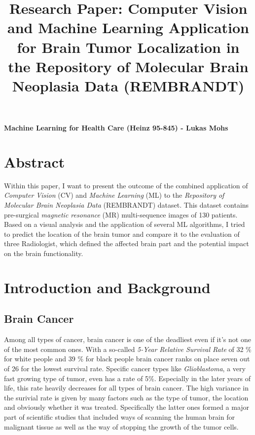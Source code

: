 \documentclass[twoside,11pt]{article}
\begin{document}
\title{Research Paper: Computer Vision and Machine Learning Application for Brain Tumor Localization in the  Repository of Molecular Brain Neoplasia Data (REMBRANDT) }

\maketitle
\textbf{Machine Learning for Health Care (Heinz 95-845) - Lukas Mohs}


\section{Abstract}
\noindent Within this paper, I want to present the outcome of the  combined application of \textit{Computer Vision} (CV) and  \textit{Machine Learning} (ML) to the \textit{Repository of Molecular Brain Neoplasia Data } (REMBRANDT) dataset. This dataset contains pre-surgical \textit{magnetic resonance} (MR) multi-sequence images of 130 patients. Based on a visual analysis and the application of several ML algorithms, I tried to predict the location of the brain tumor and compare it to the evaluation of three Radiologist, which defined the affected brain part and the potential impact on the brain functionality.

\section{Introduction and Background}
\subsection{Brain Cancer}
Among all types of cancer, brain cancer is one of the deadliest even if it's not one of the most common ones. With a so-called \textit{5-Year Relative Survival Rate} of 32 \% for white people and 39 \% for black people brain cancer ranks on place seven out of 26 for the lowest survival rate. Specific cancer types like \textit{Glioblastoma}, a very fast growing type of tumor, even has a  rate of 5\%. Especially in the later years of life, this rate heavily decreases for all types of brain cancer. \citep{cite1}
The high variance in the surivial rate is given by many factors such as the type of tumor, the location and obviously whether it was treated. Specifically the latter ones formed a major part of scientific studies that included ways of scanning the human brain for malignant tissue as well as the way of stopping the growth of the tumor cells. \citep{cite2}
\end{document}
